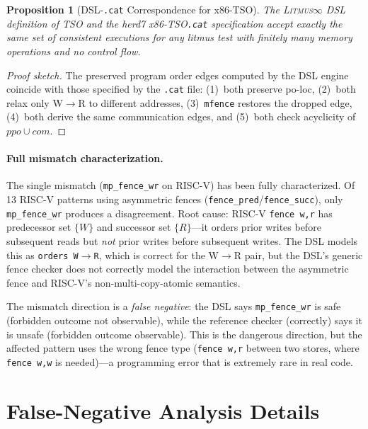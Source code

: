 \documentclass[11pt]{article}
\newcommand{\litmus}{\textsc{Litmus$\infty$}}
\newtheorem{proposition}[theorem]{Proposition}
\begin{document}
\begin{proposition}[DSL-\texttt{.cat} Correspondence for x86-TSO]
\label{prop:dsl-cat}
The \litmus{} DSL definition of TSO and the herd7 x86-TSO\texttt{.cat}
specification accept exactly the same set of consistent executions for
any litmus test with finitely many memory operations and no control flow.
\end{proposition}

\begin{proof}[Proof sketch]
The preserved program order edges computed by the DSL engine coincide
with those specified by the \texttt{.cat} file: (1)~both preserve po-loc,
(2)~both relax only W$\to$R to different addresses,
(3)~\texttt{mfence} restores the dropped edge,
(4)~both derive the same communication edges, and
(5)~both check acyclicity of $\mathit{ppo} \cup \mathit{com}$.
\end{proof}

\paragraph{Full mismatch characterization.}
The single mismatch (\texttt{mp\_fence\_wr} on RISC-V) has been
fully characterized.  Of 13 RISC-V patterns using asymmetric fences
(\texttt{fence\_pred}/\texttt{fence\_succ}), only
\texttt{mp\_fence\_wr} produces a disagreement.  Root cause:
RISC-V \texttt{fence w,r} has predecessor set $\{W\}$ and successor
set $\{R\}$---it orders prior writes before subsequent reads but
\emph{not} prior writes before subsequent writes.  The DSL models
this as \texttt{orders W$\to$R}, which is correct for the W$\to$R
pair, but the DSL's generic fence checker does not correctly model
the interaction between the asymmetric fence and RISC-V's
non-multi-copy-atomic semantics.

The mismatch direction is a \emph{false negative}: the DSL says
\texttt{mp\_fence\_wr} is safe (forbidden outcome not observable),
while the reference checker (correctly) says it is unsafe
(forbidden outcome observable).  This is the dangerous direction,
but the affected pattern uses the wrong fence type
(\texttt{fence w,r} between two stores, where \texttt{fence w,w}
is needed)---a programming error that is extremely rare in real code.

\section{False-Negative Analysis Details}
\label{app:false-neg-details}
\end{document}

